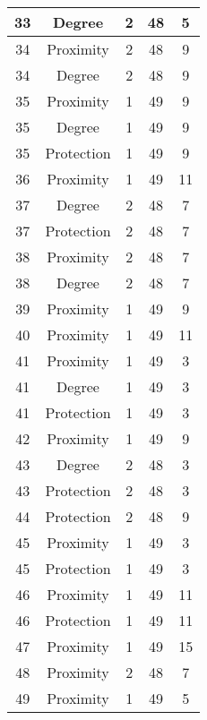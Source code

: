 \documentclass[results.tex]{subfiles}
\begin{document}
\begin{center}
\begin{tabular}{| c || c | c | c | c |}
    33 & Degree & 2 & 48 & 5 \\ 
    \hline
    34 & Proximity & 2 & 48 & 9 \\ 
    \hline
    34 & Degree & 2 & 48 & 9 \\ 
    \hline
    35 & Proximity & 1 & 49 & 9 \\ 
    \hline
    35 & Degree & 1 & 49 & 9 \\ 
    \hline
    35 & Protection & 1 & 49 & 9 \\ 
    \hline
    36 & Proximity & 1 & 49 & 11 \\ 
    \hline
    37 & Degree & 2 & 48 & 7 \\ 
    \hline
    37 & Protection & 2 & 48 & 7 \\ 
    \hline
    38 & Proximity & 2 & 48 & 7 \\ 
    \hline
    38 & Degree & 2 & 48 & 7 \\ 
    \hline
    39 & Proximity & 1 & 49 & 9 \\ 
    \hline
    40 & Proximity & 1 & 49 & 11 \\ 
    \hline
    41 & Proximity & 1 & 49 & 3 \\ 
    \hline
    41 & Degree & 1 & 49 & 3 \\ 
    \hline
    41 & Protection & 1 & 49 & 3 \\ 
    \hline
    42 & Proximity & 1 & 49 & 9 \\ 
    \hline
    43 & Degree & 2 & 48 & 3 \\ 
    \hline
    43 & Protection & 2 & 48 & 3 \\ 
    \hline
    44 & Protection & 2 & 48 & 9 \\ 
    \hline
    45 & Proximity & 1 & 49 & 3 \\ 
    \hline
    45 & Protection & 1 & 49 & 3 \\ 
    \hline
    46 & Proximity & 1 & 49 & 11 \\ 
    \hline
    46 & Protection & 1 & 49 & 11 \\ 
    \hline
    47 & Proximity & 1 & 49 & 15 \\ 
    \hline
    48 & Proximity & 2 & 48 & 7 \\ 
    \hline
    49 & Proximity & 1 & 49 & 5 \\ 
    \hline   \end{tabular}
\end{center}
\end{document}
